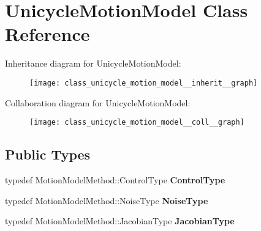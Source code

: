 \hypertarget{class_unicycle_motion_model}{\section{\-Unicycle\-Motion\-Model \-Class \-Reference}
\label{class_unicycle_motion_model}
}


\-Inheritance diagram for \-Unicycle\-Motion\-Model\-:
\nopagebreak
\begin{figure}[H]
\begin{center}
\leavevmode
\texttt{[image: class\_unicycle\_motion\_model\_\_inherit\_\_graph]}
\end{center}
\end{figure}


\-Collaboration diagram for \-Unicycle\-Motion\-Model\-:
\nopagebreak
\begin{figure}[H]
\begin{center}
\leavevmode
\texttt{[image: class\_unicycle\_motion\_model\_\_coll\_\_graph]}
\end{center}
\end{figure}
\subsection*{\-Public \-Types}
\begin{DoxyCompactItemize}
\item 
\hypertarget{class_unicycle_motion_model_add1e93839ad31a6b054551b31c6747ea}{typedef \*
\-Motion\-Model\-Method\-::\-Control\-Type {\bfseries \-Control\-Type}}\label{class_unicycle_motion_model_add1e93839ad31a6b054551b31c6747ea}

\item 
\hypertarget{class_unicycle_motion_model_a08ee5aeadfc71eaa00720bd56af71dfd}{typedef \*
\-Motion\-Model\-Method\-::\-Noise\-Type {\bfseries \-Noise\-Type}}\label{class_unicycle_motion_model_a08ee5aeadfc71eaa00720bd56af71dfd}

\item 
\hypertarget{class_unicycle_motion_model_aa7338364013e6001f926aa2a77f41df6}{typedef \*
\-Motion\-Model\-Method\-::\-Jacobian\-Type {\bfseries \-Jacobian\-Type}}\label{class_unicycle_motion_model_aa7338364013e6001f926aa2a77f41df6}

\end{DoxyCompactItemize}
